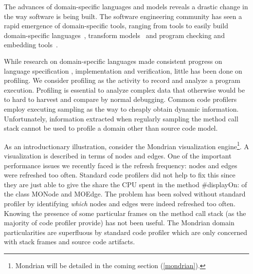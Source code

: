 \documentclass[runningheads]{llncs}
\newcommand{\ab}[1]{\nb{Alexandre}{blue}{#1}}
\newcommand{\lr}[1]{\nb{Lukas}{orange}{#1}}
\newcommand{\co}[1]{{\sf #1}}
\begin{document}
The advances of domain-specific languages and models reveals a drastic change in the way software is being built. 
The software engineering community has seen a rapid emergence of domain-specific tools, ranging from tools to easily build domain-specific languages~\cite{Viss04a}, transform models~\cite{Tisi10a} and program checking and embedding tools~\cite{Reng10b}.

While research on domain-specific languages made consistent progress on language specification \cite{Deur00a}, implementation and verification, little has been done on profiling. %
We consider profiling as the activity to record and analyze a program execution. Profiling is essential to analyze complex data that otherwise would be to hard to harvest and compare by normal debugging.
Common code profilers employ executing sampling as the way to cheaply obtain dynamic information. 
Unfortunately, information extracted when regularly sampling the method call stack cannot be used to profile a domain other than source code model.

As an introductionary illustration, consider the Mondrian visualization engine\footnote{Mondrian will be detailed in the coming section (\autoref{mondrian}).}. A visualization is described in terms of nodes and edges. One of the important performance issues we recently faced is the refresh frequency: nodes and edges were refreshed too often.
Standard code profilers did not help to fix this since they are just able to give the share the CPU spent in the method \co{\#displayOn:} of the class \co{MONode} and \co{MOEdge}. The problem has been solved without standard profiler by identifying \emph{which} nodes and edges were indeed refreshed too often. Knowing the presence of some particular frames on the method call stack (as the majority of code profiler provide) has not been useful. The Mondrian domain particularities are superfluous by standard code profiler which are only concerned with stack frames and source code artifacts.
\end{document}
